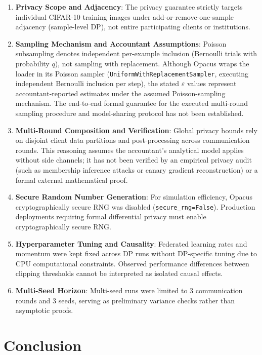 \documentclass[11pt,a4paper]{article}
\begin{document}
\begin{enumerate}
    \item \textbf{Privacy Scope and Adjacency}: The privacy guarantee strictly targets individual CIFAR-10 training images under add-or-remove-one-sample adjacency (sample-level DP), not entire participating clients or institutions.
    \item \textbf{Sampling Mechanism and Accountant Assumptions}: Poisson subsampling denotes independent per-example inclusion (Bernoulli trials with probability $q$), not sampling with replacement. Although Opacus wraps the loader in its Poisson sampler (\texttt{Uniform\-With\-Replacement\-Sampler}, executing independent Bernoulli inclusion per step), the stated $\varepsilon$ values represent accountant-reported estimates under the assumed Poisson-sampling mechanism. The end-to-end formal guarantee for the executed multi-round sampling procedure and model-sharing protocol has not been established.
    \item \textbf{Multi-Round Composition and Verification}: Global privacy bounds rely on disjoint client data partitions and post-processing across communication rounds. This reasoning assumes the accountant's analytical model applies without side channels; it has not been verified by an empirical privacy audit (such as membership inference attacks or canary gradient reconstruction) or a formal external mathematical proof.
    \item \textbf{Secure Random Number Generation}: For simulation efficiency, Opacus cryptographically secure RNG was disabled (\texttt{secure\_rng=False}). Production deployments requiring formal differential privacy must enable cryptographically secure RNG.
    \item \textbf{Hyperparameter Tuning and Causality}: Federated learning rates and momentum were kept fixed across DP runs without DP-specific tuning due to CPU computational constraints. Observed performance differences between clipping thresholds cannot be interpreted as isolated causal effects.
    \item \textbf{Multi-Seed Horizon}: Multi-seed runs were limited to 3 communication rounds and 3 seeds, serving as preliminary variance checks rather than asymptotic proofs.
\end{enumerate}

\section{Conclusion}
\end{document}
